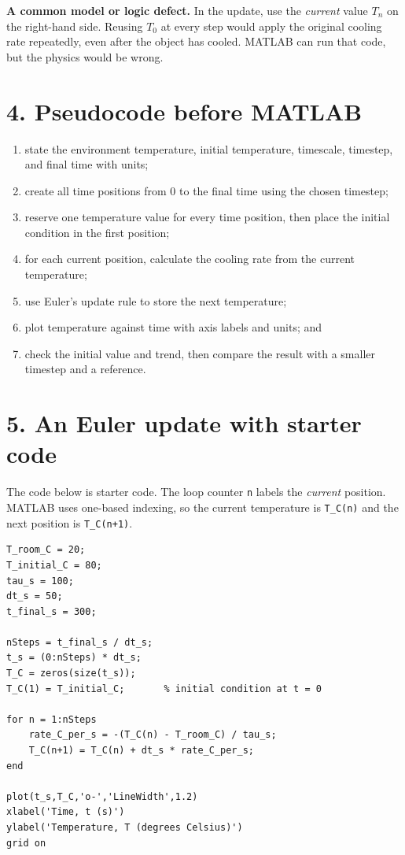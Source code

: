 \documentclass[11pt,a4paper]{article}
\begin{document}
\begin{aibox}\textbf{A common model or logic defect.} In the update, use the \emph{current} value $T_n$ on the right-hand side. Reusing $T_0$ at every step would apply the original cooling rate repeatedly, even after the object has cooled. MATLAB can run that code, but the physics would be wrong.\end{aibox}

\section*{4. Pseudocode before MATLAB}
\begin{enumerate}[nosep,leftmargin=7mm]
\item state the environment temperature, initial temperature, timescale, timestep, and final time with units;
\item create all time positions from $0$ to the final time using the chosen timestep;
\item reserve one temperature value for every time position, then place the initial condition in the first position;
\item for each current position, calculate the cooling rate from the current temperature;
\item use Euler's update rule to store the next temperature;
\item plot temperature against time with axis labels and units; and
\item check the initial value and trend, then compare the result with a smaller timestep and a reference.
\end{enumerate}

\section*{5. An Euler update with starter code}
The code below is starter code. The loop counter \texttt{n} labels the \emph{current} position. MATLAB uses one-based indexing, so the current temperature is \texttt{T\_C(n)} and the next position is \texttt{T\_C(n+1)}.

\begin{lstlisting}[style=matlabstyle,caption={Euler simulation of Newton cooling with a labelled temperature plot.}]
T_room_C = 20;
T_initial_C = 80;
tau_s = 100;
dt_s = 50;
t_final_s = 300;

nSteps = t_final_s / dt_s;
t_s = (0:nSteps) * dt_s;
T_C = zeros(size(t_s));
T_C(1) = T_initial_C;       % initial condition at t = 0

for n = 1:nSteps
    rate_C_per_s = -(T_C(n) - T_room_C) / tau_s;
    T_C(n+1) = T_C(n) + dt_s * rate_C_per_s;
end

plot(t_s,T_C,'o-','LineWidth',1.2)
xlabel('Time, t (s)')
ylabel('Temperature, T (degrees Celsius)')
grid on
\end{lstlisting}
\end{document}
